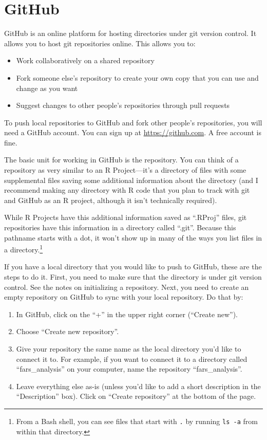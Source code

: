 \documentclass[]{tufte-book}
\providecommand{\tightlist}{%
  \setlength{\itemsep}{0pt}\setlength{\parskip}{0pt}}
\begin{document}
\hypertarget{github}{%
\section{GitHub}\label{github}}

GitHub is an online platform for hosting directories under git version control.
It allows you to host git repositories online. This allows you to:

\begin{itemize}
\tightlist
\item
  Work collaboratively on a shared repository
\item
  Fork someone else's repository to create your own copy that you can use and change as you want
\item
  Suggest changes to other people's repositories through pull requests
\end{itemize}

To push local repositories to GitHub and fork other people's repositories, you
will need a GitHub account. You can sign up at \url{https://github.com}. A free
account is fine.

The basic unit for working in GitHub is the repository. You can think of a
repository as very similar to an R Project---it's a directory of files with
some supplemental files saving some additional information about the directory
(and I recommend making any directory with R code that you plan to track with
git and GitHub as an R project, although it isn't technically required).

While R Projects have this additional information saved as ``.RProj'' files, git
repositories have this information in a directory called ``.git''. Because this
pathname starts with a dot, it won't show up in many of the ways you list files
in a directory.\footnote{From a Bash shell, you can see files that start with \texttt{.} by running
  \texttt{ls\ -a} from within that directory.}

If you have a local directory that you would like to push to GitHub, these are
the steps to do it. First, you need to make sure that the directory is under git
version control. See the notes on initializing a repository. Next, you need to
create an empty repository on GitHub to sync with your local repository. Do that
by:

\begin{enumerate}
\def\labelenumi{\arabic{enumi}.}
\tightlist
\item
  In GitHub, click on the ``+'' in the upper right corner (``Create new'').
\item
  Choose ``Create new repository''.
\item
  Give your repository the same name as the local directory you'd like to
  connect it to. For example, if you want to connect it to a directory called
  ``fars\_analysis'' on your computer, name the repository ``fars\_analysis''.
\item
  Leave everything else as-is (unless you'd like to add a short description in
  the ``Description'' box). Click on ``Create repository'' at the bottom of the page.
\end{enumerate}
\end{document}
